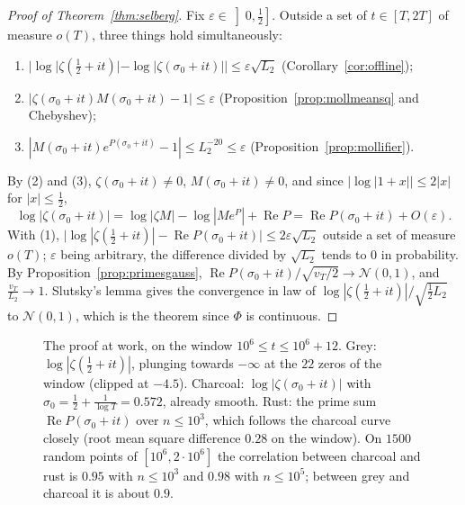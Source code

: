 \begin{proof}[Proof of Theorem~\ref{thm:selberg}]
Fix $\varepsilon\in\left]0,\frac12\right]$. Outside a set of $t\in[T,2T]$ of measure $o(T)$, three things hold simultaneously:
\begin{enumerate}
\item $|\log|\zeta(\frac12+it)|-\log|\zeta(\sigma_0+it)||\le\varepsilon\sqrt{L_2}$ (Corollary~\ref{cor:offline});
\item $|\zeta(\sigma_0+it)M(\sigma_0+it)-1|\le\varepsilon$ (Proposition~\ref{prop:mollmeansq} and Chebyshev);
\item $|M(\sigma_0+it)e^{P(\sigma_0+it)}-1|\le L_2^{-20}\le\varepsilon$ (Proposition~\ref{prop:mollifier}).
\end{enumerate}
By (2) and (3), $\zeta(\sigma_0+it)\ne0$, $M(\sigma_0+it)\ne0$, and since $|\log|1+x||\le2|x|$ for $|x|\le\frac12$,
\[
\log|\zeta(\sigma_0+it)|=\log|\zeta M|-\log|Me^P|+\operatorname{Re}P=\operatorname{Re}P(\sigma_0+it)+O(\varepsilon).
\]
With (1), $\bigl|\log|\zeta(\frac12+it)|-\operatorname{Re}P(\sigma_0+it)\bigr|\le2\varepsilon\sqrt{L_2}$ outside a set of measure $o(T)$; $\varepsilon$ being arbitrary, the difference divided by $\sqrt{L_2}$ tends to $0$ in probability. By Proposition~\ref{prop:primesgauss}, $\operatorname{Re}P(\sigma_0+it)/\sqrt{v_T/2}\to\mathcal N(0,1)$, and $\frac{v_T}{L_2}\to1$. Slutsky's lemma gives the convergence in law of $\log|\zeta(\frac12+it)|/\sqrt{\frac12L_2}$ to $\mathcal N(0,1)$, which is the theorem since $\Phi$ is continuous.
\end{proof}

\begin{figure}[ht]
\centering{}
\caption{The proof at work, on the window $10^6\le t\le10^6+12$. Grey: $\log|\zeta(\frac12+it)|$, plunging towards $-\infty$ at the $22$ zeros of the window (clipped at $-4.5$). Charcoal: $\log|\zeta(\sigma_0+it)|$ with $\sigma_0=\frac12+\frac1{\log T}=0.572$, already smooth. Rust: the prime sum $\operatorname{Re}P(\sigma_0+it)$ over $n\le10^3$, which follows the charcoal curve closely (root mean square difference $0.28$ on the window). On $1500$ random points of $[10^6,2\cdot10^6]$ the correlation between charcoal and rust is $0.95$ with $n\le10^3$ and $0.98$ with $n\le10^5$; between grey and charcoal it is about $0.9$.}
\label{fig:selbergwindow}
\end{figure}

